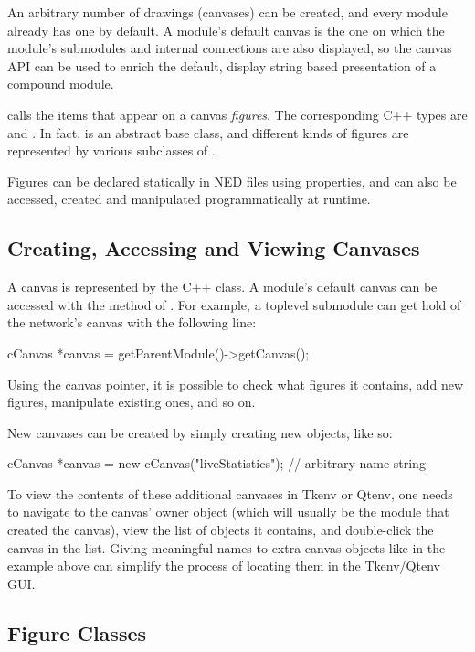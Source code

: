 An arbitrary number of drawings (canvases) can be created, and every module
already has one by default. A module's default canvas is the one on which
the module's submodules and internal connections are also displayed, so the
canvas API can be used to enrich the default, display string based
presentation of a compound module.

{\opp} calls the items that appear on a canvas \textit{figures}. The
corresponding C++ types are  and . In fact,
 is an abstract base class, and different kinds of figures
are represented by various subclasses of .

Figures can be declared statically in NED files using 
properties, and can also be accessed, created and manipulated
programmatically at runtime.


\subsection{Creating, Accessing and Viewing Canvases}

A canvas is represented by the  C++ class. A module's
default canvas can be accessed with the  method of
. For example, a toplevel submodule can get hold of the
network's canvas with the following line:

\begin{cpp}
cCanvas *canvas = getParentModule()->getCanvas();
\end{cpp}

Using the canvas pointer, it is possible to check what figures it
contains, add new figures, manipulate existing ones, and so on.

New canvases can be created by simply creating new 
objects, like so:

\begin{cpp}
cCanvas *canvas = new cCanvas("liveStatistics"); // arbitrary name string
\end{cpp}

To view the contents of these additional canvases in Tkenv or Qtenv, one
needs to navigate to the canvas' owner object (which will usually be the
module that created the canvas), view the list of objects it contains, and
double-click the canvas in the list. Giving meaningful names to extra
canvas objects like in the example above can simplify the process of
locating them in the Tkenv/Qtenv GUI.


\subsection{Figure Classes}

